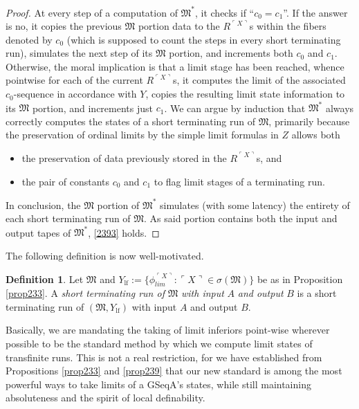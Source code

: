 \documentclass[12pt, twoside]{memoir}
\numberwithin{equation}{section}
\theoremstyle{definition}
\newtheorem{defi}[thm]{Definition}
\theoremstyle{remark}
\theoremstyle{definition}
\theoremstyle{definition}
\theoremstyle{definition}
\theoremstyle{remark}
\begin{document}
\begin{proof}
At every step of a computation of $\mathfrak{M}^*$, it checks if ``$c_0 = c_1$''. If the answer is no, it copies the previous $\mathfrak{M}$ portion data to the $R^{\ulcorner X \urcorner}$s within the fibers denoted by $c_0$ (which is supposed to count the steps in every short terminating run), simulates the next step of its $\mathfrak{M}$ portion, and increments both $c_0$ and $c_1$. Otherwise, the moral implication is that a limit stage has been reached, whence pointwise for each of the current $R^{\ulcorner X \urcorner}$s, it computes the limit of the associated $c_0$-sequence in accordance with $Y$, copies the resulting limit state information to its $\mathfrak{M}$ portion, and increments just $c_1$. We can argue by induction that $\mathfrak{M}^*$ always correctly computes the states of a short terminating run of $\mathfrak{M}$, primarily because the preservation of ordinal limits by the simple limit formulas in $Z$ allows both
\begin{itemize}
    \item the preservation of data previously stored in the $R^{\ulcorner X \urcorner}$s, and
    \item the pair of constants $c_0$ and $c_1$ to flag limit stages of a terminating run.
\end{itemize} 

In conclusion, the $\mathfrak{M}$ portion of $\mathfrak{M}^*$ simulates (with some latency) the entirety of each short terminating run of $\mathfrak{M}$. As said portion contains both the input and output tapes of $\mathfrak{M}^*$, \ref{2393} holds.
\end{proof}

The following definition is now well-motivated.

\begin{defi}
Let $\mathfrak{M}$ and $Y_{\mathrm{lf}} := \{\phi_{lim}^{\ulcorner X \urcorner} : \ulcorner X \urcorner \in \sigma(\mathfrak{M})\}$ be as in Proposition \ref{prop233}. A \emph{short terminating run of} $\mathfrak{M}$ \emph{with input} $A$ \emph{and output} $B$ is a short terminating run of $(\mathfrak{M}, Y_{\mathrm{lf}})$ with input $A$ and output $B$.
\end{defi}

Basically, we are mandating the taking of limit inferiors point-wise wherever possible to be the standard method by which we compute limit states of transfinite runs. This is not a real restriction, for we have established from Propositions \ref{prop233} and \ref{prop239} that our new standard is among the most powerful ways to take limits of a GSeqA's states, while still maintaining absoluteness and the spirit of local definability.
\end{document}
